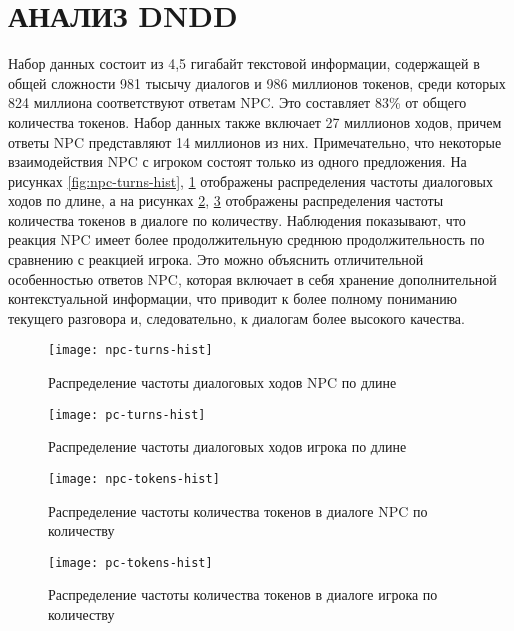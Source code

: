 \section{АНАЛИЗ DNDD}
Набор данных состоит из 4,5 гигабайт текстовой информации, содержащей в общей сложности 981 тысычу диалогов и 986 миллионов токенов, среди которых 824 миллиона соответствуют ответам NPC. Это составляет 83\% от общего количества токенов. Набор данных также включает 27 миллионов ходов, причем ответы NPC представляют 14 миллионов из них. Примечательно, что некоторые взаимодействия NPC с игроком состоят только из одного предложения. На рисунках \ref{fig:npc-turns-hist}, \ref{fig:pc-turns-hist} отображены распределения частоты диалоговых ходов по длине, а на рисунках \ref{fig:npc-tokens-hist}, \ref{fig:pc-tokens-hist} отображены распределения частоты количества токенов в диалоге по количеству. Наблюдения показывают, что реакция NPC имеет более продолжительную среднюю продолжительность по сравнению с реакцией игрока. Это можно объяснить отличительной особенностью ответов NPC, которая включает в себя хранение дополнительной контекстуальной информации, что приводит к более полному пониманию текущего разговора и, следовательно, к диалогам более высокого качества.
\begin{figure}[H]
  \begin{minipage}{0.48\textwidth}
    \centering
    \texttt{[image: npc-turns-hist]}
    \caption{Распределение частоты диалоговых ходов NPC по длине}\label{fig:npc-turns-hist}
  \end{minipage}\hfill
  \begin{minipage}{0.48\textwidth}
    \centering
    \texttt{[image: pc-turns-hist]}
    \caption{Распределение частоты диалоговых ходов игрока по длине}\label{fig:pc-turns-hist}
  \end{minipage}
\end{figure}

\begin{figure}[H]
  \centering
  \texttt{[image: npc-tokens-hist]}
  \caption{Распределение частоты количества токенов в диалоге NPC по количеству}
  \label{fig:npc-tokens-hist}
\end{figure}

\begin{figure}[H]
  \centering
  \texttt{[image: pc-tokens-hist]}
  \caption{Распределение частоты количества токенов в диалоге игрока по количеству}
  \label{fig:pc-tokens-hist}
\end{figure}